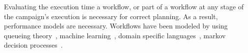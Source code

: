 
Evaluating the execution time a workflow, or part of a workflow at any stage 
of the campaign's execution is necessary for correct planning. As a result, 
performance models are necessary. Workflows have been modeled by using 
queueing theory~\cite{bao2019performance,yao2019throughput}, machine 
learning~\cite{witt2019predictive,pumma2017runtime}, domain specific 
languages~\cite{deelman2017performance,mandal2016toward}, markov decision 
processes~\cite{jia2005cost}.

